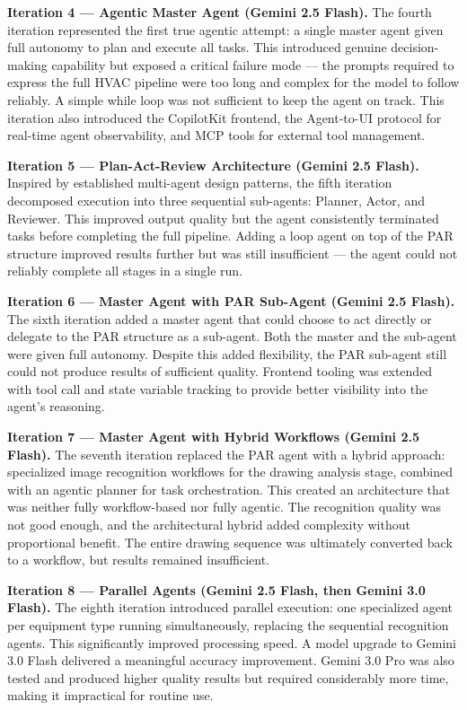 \textbf{Iteration 4 --- Agentic Master Agent (Gemini 2.5 Flash).}
The fourth iteration represented the first true agentic attempt: a single master agent
given full autonomy to plan and execute all tasks. This introduced genuine decision-making
capability but exposed a critical failure mode --- the prompts required to express the
full HVAC pipeline were too long and complex for the model to follow reliably. A simple
while loop was not sufficient to keep the agent on track. This iteration also introduced
the CopilotKit frontend, the Agent-to-UI protocol for real-time agent observability, and
MCP tools for external tool management.

\textbf{Iteration 5 --- Plan-Act-Review Architecture (Gemini 2.5 Flash).}
Inspired by established multi-agent design patterns, the fifth iteration decomposed
execution into three sequential sub-agents: Planner, Actor, and Reviewer. This improved
output quality but the agent consistently terminated tasks before completing the full
pipeline. Adding a loop agent on top of the PAR structure improved results further but
was still insufficient --- the agent could not reliably complete all stages in a single
run.

\textbf{Iteration 6 --- Master Agent with PAR Sub-Agent (Gemini 2.5 Flash).}
The sixth iteration added a master agent that could choose to act directly or delegate to
the PAR structure as a sub-agent. Both the master and the sub-agent were given full
autonomy. Despite this added flexibility, the PAR sub-agent still could not produce
results of sufficient quality. Frontend tooling was extended with tool call and state
variable tracking to provide better visibility into the agent's reasoning.

\textbf{Iteration 7 --- Master Agent with Hybrid Workflows (Gemini 2.5 Flash).}
The seventh iteration replaced the PAR agent with a hybrid approach: specialized image
recognition workflows for the drawing analysis stage, combined with an agentic planner
for task orchestration. This created an architecture that was neither fully workflow-based
nor fully agentic. The recognition quality was not good enough, and the architectural
hybrid added complexity without proportional benefit. The entire drawing sequence was
ultimately converted back to a workflow, but results remained insufficient.

\textbf{Iteration 8 --- Parallel Agents (Gemini 2.5 Flash, then Gemini 3.0 Flash).}
The eighth iteration introduced parallel execution: one specialized agent per equipment
type running simultaneously, replacing the sequential recognition agents. This
significantly improved processing speed. A model upgrade to Gemini 3.0 Flash delivered
a meaningful accuracy improvement. Gemini 3.0 Pro was also tested and produced higher
quality results but required considerably more time, making it impractical for routine
use.

